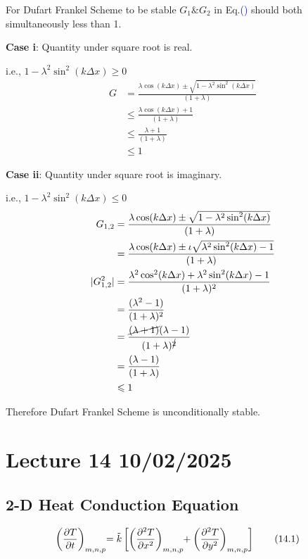 \documentclass[fleqn,10pt]{SelfArx} %
\newcommand{\myeqref}[1]{Eq.\textcolor{blue}{\textup{(\getrefnumber{#1})}}}
\begin{document}
For Dufart Frankel Scheme to be stable $G_1 \& G_2$ in \myeqref{eq:13.16} should both simultaneously less than 1.

\textbf{Case i}: Quantity under square root is real.

i.e., $1-\lambda^2\sin^2(k\Delta x) \geqslant 0$
\begin{align*}
	G &=  \frac{\lambda \cos(k\Delta x) \pm \sqrt{1 - \lambda^2\sin^2(k\Delta x)}}{(1+\lambda)} \\
	 &\leqslant \frac{\lambda \cos(k\Delta x)+1}{(1+\lambda)} \\
	 &\leqslant \frac{\lambda +1}{(1+\lambda)} \\
	 &\leqslant 1
\end{align*}

\textbf{Case ii}: Quantity under square root is imaginary.

i.e., $1-\lambda^2\sin^2(k\Delta x) \leqslant 0$
\begin{align*}
	G_{1,2} &= \frac{\lambda \cos(k\Delta x) \pm \sqrt{1 - \lambda^2\sin^2(k\Delta x)}}{(1+\lambda)} \\ 
	  &= \frac{\lambda \cos(k\Delta x) \pm \iota \sqrt{\lambda^2\sin^2(k\Delta x) - 1}}{(1+\lambda)} \\
	|G_{1,2}^2| &= \frac{\lambda^2 \cos^2(k\Delta x) + \lambda^2\sin^2(k\Delta x) - 1}{(1+\lambda)^2} \\ 
		    &= \frac{(\lambda^2 - 1)}{(1+\lambda)^2} \\
		    &= \frac{\cancel{(\lambda + 1)}(\lambda - 1)}{(1+\lambda)^{\cancel{2}}} \\
		    &= \frac{(\lambda - 1)}{(1+\lambda)} \\
		    &\leqslant 1
\end{align*}

Therefore Dufart Frankel Scheme is unconditionally stable.

\clearpage

\section{Lecture 14 10/02/2025}
\subsection{2-D Heat Conduction Equation}
\begin{align*}
	\left(\frac{\partial T}{\partial t}\right)_{\smash{m,n,p}} \mspace{-5mu} &= \tilde{k} \left[ \left(\frac{\partial^2 T}{\partial x^2}\right)_{\smash{m,n,p}} \mspace{-5mu} + \left(\frac{\partial^2 T}{\partial y^2}\right)_{\smash{m,n,p}} \right] \tag{14.1} \label{eq:2dheateq}
\end{align*}
\end{document}
